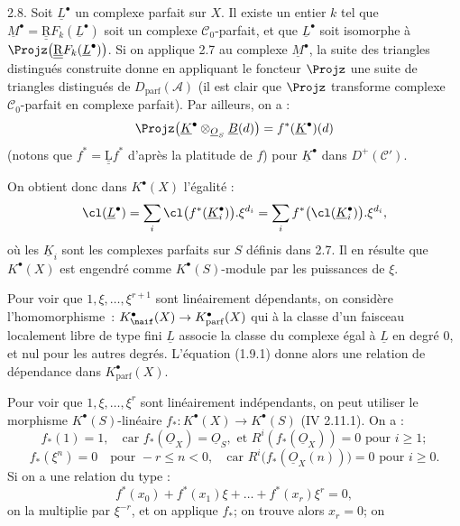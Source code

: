 
2.8.
Soit $\underline{L}^{\bullet}$ un complexe parfait sur $X$. Il existe un entier $k$ tel que $\underline{M}^{\bullet}=\underline{\underline{\mathrm R}} F_k(\underline{L}^{\bullet})$ soit un complexe $\mathcal C_0$-parfait, et que $\underline{L}^{\bullet}$ soit isomorphe à $\Projz\bigl(\underline{\underline{\mathrm R}} F_k(\underline{L}^{\bullet})\bigr)$. Si on applique 2.7 au complexe $\underline{M}^{\bullet}$, la suite des triangles distingués construite donne en appliquant le foncteur $\Projz$ une suite de triangles distingués de $D_{\mathrm{parf}}(\mathcal A)$ (il est clair que $\Projz$ transforme complexe $\mathcal C_0$-parfait en complexe parfait). Par ailleurs, on a :
\[
  \Projz\bigl(\underline{K}^{\bullet}\otimes_{\underline{O}_S}\underline{B}(d)\bigr)
  = f^*(\underline{K}^{\bullet})(d)
\]
(notons que $f^*=\underline{\underline{\mathrm L}} f^*$ d'après la platitude de $f$) pour $\underline{K}^{\bullet}$ dans $D^+(\mathcal C')$.

On obtient donc dans $K^{\bullet}(X)$ l'égalité :
\[
  \cl(\underline{L}^{\bullet})
  =\sum_i\cl\bigl(f^*(\underline{K}_i^{\bullet})\bigr).\xi^{d_i}
  =\sum_i f^*\bigl(\cl(\underline{K}_i^{\bullet})\bigr).\xi^{d_i},
\]
où les $\underline{K}_i$ sont les complexes parfaits sur $S$ définis dans 2.7. Il en résulte que $K^{\bullet}(X)$ est engendré comme $K^{\bullet}(S)$-module par les puissances de $\xi$.

Pour voir que $1,\xi,\ldots,\xi^{r+1}$ sont linéairement dépendants, on considère l'homomorphisme~: $K^{\bullet}_{\naif}(X)\to K^{\bullet}_{\mathrm{parf}}(X)$ qui à la classe d'un faisceau localement libre de type fini $\underline{L}$ associe la classe du complexe égal à $\underline{L}$ en degré $0$, et nul pour les autres degrés. L'équation (1.9.1) donne alors une relation de dépendance dans $K^{\bullet}_{\mathrm{parf}}(X)$.

Pour voir que $1,\xi,\ldots,\xi^r$ sont linéairement indépendants, on peut utiliser le morphisme $K^{\bullet}(S)$-linéaire $f_*:K^{\bullet}(X)\to K^{\bullet}(S)$ (IV 2.11.1). On a :
\[
  f_*(1)=1,
  \quad\text{car } f_*(\underline{O}_X)=\underline{O}_S,\text{ et }R^i(f_*(\underline{O}_X))=0\text{ pour }i\geq1;
\]
\[
  f_*(\xi^n)=0\quad\text{pour }-r\leq n<0,
  \quad\text{car }R^i\bigl(f_*(\underline{O}_X(n))\bigr)=0\text{ pour }i\geq0.
\]
Si on a une relation du type :
\[
  f^*(x_0)+f^*(x_1)\xi+\ldots+f^*(x_r)\xi^r=0,
\]
on la multiplie par $\xi^{-r}$, et on applique $f_*$; on trouve alors $x_r=0$; on 

